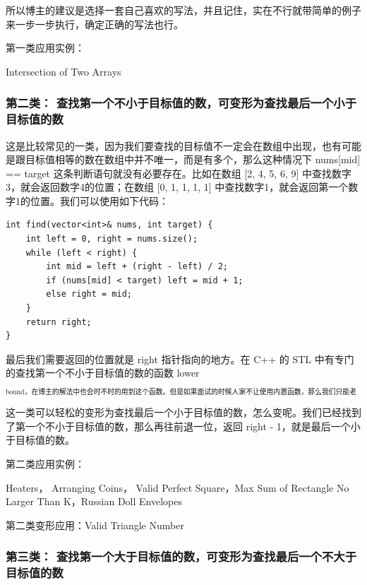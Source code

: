 \documentclass[9pt, b5paper]{article}
\begin{document}
所以博主的建议是选择一套自己喜欢的写法，并且记住，实在不行就带简单的例子来一步一步执行，确定正确的写法也行。

第一类应用实例：

Intersection of Two Arrays

\subsubsection{第二类： 查找第一个不小于目标值的数，可变形为查找最后一个小于目标值的数}
\label{sec-14-1-2}

这是比较常见的一类，因为我们要查找的目标值不一定会在数组中出现，也有可能是跟目标值相等的数在数组中并不唯一，而是有多个，那么这种情况下 nums[mid] == target 这条判断语句就没有必要存在。比如在数组 [2, 4, 5, 6, 9] 中查找数字3，就会返回数字4的位置；在数组 [0, 1, 1, 1, 1] 中查找数字1，就会返回第一个数字1的位置。我们可以使用如下代码：
\begin{verbatim}
int find(vector<int>& nums, int target) {
    int left = 0, right = nums.size();
    while (left < right) {
        int mid = left + (right - left) / 2;
        if (nums[mid] < target) left = mid + 1;
        else right = mid;
    }
    return right;
}
\end{verbatim}

最后我们需要返回的位置就是 right 指针指向的地方。在 C++ 的 STL 中有专门的查找第一个不小于目标值的数的函数 lower$_{\text{bound，在博主的解法中也会时不时的用到这个函数。但是如果面试的时候人家不让使用内置函数，那么我们只能老老实实写上面这段二分查找的函数。}}$

这一类可以轻松的变形为查找最后一个小于目标值的数，怎么变呢。我们已经找到了第一个不小于目标值的数，那么再往前退一位，返回 right - 1，就是最后一个小于目标值的数。

第二类应用实例：

Heaters， Arranging Coins， Valid Perfect Square，Max Sum of Rectangle No Larger Than K，Russian Doll Envelopes

第二类变形应用：Valid Triangle Number

\subsubsection{第三类： 查找第一个大于目标值的数，可变形为查找最后一个不大于目标值的数}
\label{sec-14-1-3}
\end{document}
